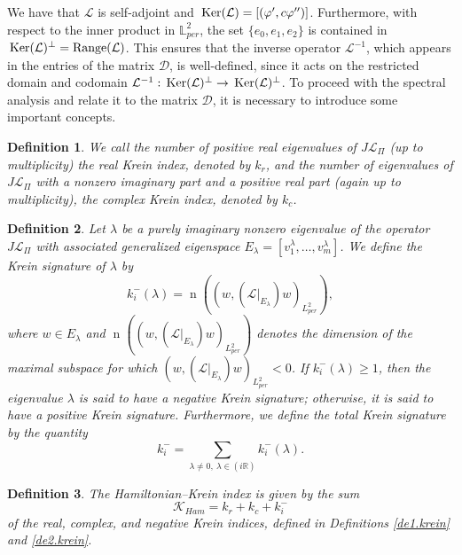 \documentclass[12pt,reqno,a4paper]{amsart} %
\newtheorem{defi}{Definition}[section]
\newcommand{\Ker}{{\rm \,Ker}}
\numberwithin{equation}{section}
\numberwithin{figure}{section}
\begin{document}
We have that $\mathcal{L}$ is self-adjoint and $\Ker(\mathcal{L}) = [(\varphi',c\varphi'')]$. Furthermore, with respect to the inner product in $\mathbb{L}^2_{per}$, the set $\{e_0,e_1,e_2\}$ is contained in $\Ker(\mathcal{L})^\perp=\operatorname{Range}(\mathcal{L})$. This ensures that the inverse operator $\mathcal{L}^{-1}$, which appears in the entries of the matrix $\mathcal{D}$, is well-defined, since it acts on the restricted domain and codomain $\mathcal{L}^{-1} :\Ker(\mathcal{L})^\perp\rightarrow \Ker(\mathcal{L})^\perp$. To proceed with the spectral analysis and relate it to the matrix $\mathcal{D}$, it is necessary to introduce some important concepts.
 
 \begin{defi}\label{de1.krein}
 We call the number of positive real eigenvalues of $J \mathcal{L}_{\Pi}$ (up to multiplicity) the real Krein index, denoted by $k_r$, and the number of eigenvalues of $J \mathcal{L}_{\Pi}$ with a nonzero imaginary part and a positive real part (again up to multiplicity), the complex Krein index, denoted by $k_c$.
 \end{defi}
 
 \begin{defi}\label{de2.krein}
 	Let $\lambda$ be a purely imaginary nonzero eigenvalue of the operator $J \mathcal{L}_{\Pi}$
 	with associated generalized eigenspace $E_\lambda= [v_1^\lambda, \dots, v_m^\lambda]$. We define the Krein signature of $\lambda$ by
 	\begin{equation*}
 		k_i^{-}(\lambda)=\operatorname{n} \left((w,(\mathcal{L} |_{E_\lambda})w)_{L^2_{per}}  \right), 
 	\end{equation*}where $w \in E_\lambda$ and $\operatorname{n} \left((w,(\mathcal{L}|_{E_\lambda})w)_{L^2_{per}}  \right)$ denotes the dimension of the maximal subspace for which  $(w,(\mathcal{L}|_{E_\lambda})w)_{L^2_{per}} <0$. If $k_i^-(\lambda) \ge 1$, then the eigenvalue $\lambda$ is said to have a negative Krein signature; otherwise, it is said to have a positive Krein signature. Furthermore, we define the total Krein signature by the quantity
 	\begin{equation*}
 		k_i^- = \sum_{ \lambda \neq 0, \ \lambda\in (i\mathbb{R})} k_i^-(\lambda).
 	\end{equation*}
 	  \end{defi}
 
 \begin{defi}\label{Hamk}
 	The Hamiltonian–Krein index is given by the sum
 	$$ 	\mathcal{K}_{Ham} =k_r+k_c+k_i^-$$
 	of the real, complex, and negative Krein indices, defined in Definitions \eqref{de1.krein} and \eqref{de2.krein}.
 \end{defi}
\end{document}

